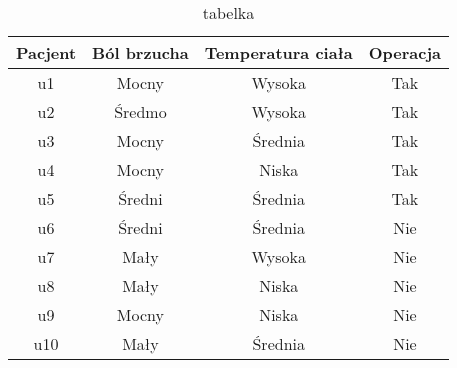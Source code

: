 \documentclass[a4paper]{article}
\begin{document}
\begin{table}[h]
\centering\caption{tabelka}
\begin{tabular}{c|c c c}
\hline
Pacjent & Ból brzucha & Temperatura ciała & Operacja \\
\hline
u1 & Mocny & Wysoka & Tak \\
u2 & Średmo & Wysoka & Tak \\
u3 & Mocny & Średnia & Tak \\
u4 & Mocny & Niska & Tak \\
u5 & Średni & Średnia & Tak \\
u6 & Średni & Średnia & Nie \\
u7 & Mały & Wysoka & Nie \\
u8 & Mały & Niska & Nie  \\
u9 & Mocny & Niska & Nie \\
u10 & Mały & Średnia & Nie\\
\hline
\end{tabular}
\end{table}
\end{document}
